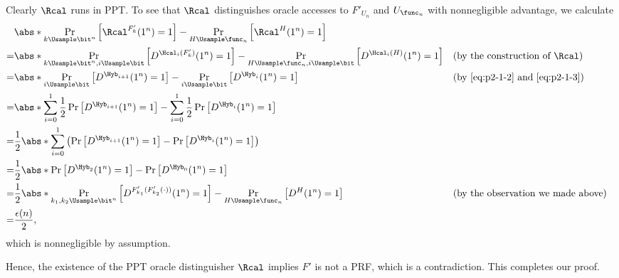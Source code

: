 \begin{answer}[a]
    Clearly $\Rcal$ runs in PPT. To see that $\Rcal$  distinguishes oracle accesses to $F'_{U_n}$ and $U_{\func_n}$ with nonnegligible advantage, we calculate
    \begin{align*}
        &\abs*{\Pr_{k\Usample\bit^n}\left[\Rcal^{F'_k}(1^n)=1\right] - \Pr_{H\Usample\func_n}\left[\Rcal^{H}(1^n)=1\right]}\\
        =&\abs*{\Pr_{k\Usample\bit^n,i\Usample\bit}\left[D^{\Hcal_i(F'_k)}(1^n)=1\right] - \Pr_{H\Usample\func_n,i\Usample\bit}\left[D^{\Hcal_i(H)}(1^n)=1\right]}
        &&\textrm{(by the construction of $\Rcal$)}\\
        =&\abs*{\Pr_{i\Usample\bit}\left[D^{\Hyb_{i+1}}(1^n)=1\right] - \Pr_{i\Usample\bit}\left[D^{\Hyb_i}(1^n)=1\right]}
        &&\textrm{(by \eqref{eq:p2-1-2} and \eqref{eq:p2-1-3})}\\
        =&\abs*{\sum_{i=0}^1 \frac{1}{2} \Pr\left[D^{\Hyb_{i+1}}(1^n)=1\right] - \sum_{i=0}^1 \frac{1}{2} \Pr\left[D^{\Hyb_i}(1^n)=1\right]}\\
        =&\frac{1}{2} \abs*{\sum_{i=0}^1 \left(  \Pr\left[D^{\Hyb_{i+1}}(1^n)=1\right] - \Pr\left[D^{\Hyb_i}(1^n)=1\right] \right) }\\
        =&\frac{1}{2} \abs*{  \Pr\left[D^{\Hyb_{2}}(1^n)=1\right] - \Pr\left[D^{\Hyb_0}(1^n)=1\right] }\\
        =&\frac{1}{2} \abs*{\Pr_{k_1,k_2\Usample\bit^n}\left[D^{F'_{k_1}(F'_{k_2}(\cdot))}(1^n)=1\right] - \Pr_{H\Usample\func_n}\left[D^{H}(1^n)=1\right]}
        && \textrm{(by the observation we made above)}\\
        =& \frac{\epsilon(n)}{2},
    \end{align*}
    which is nonnegligible by assumption.

    Hence, the existence of the PPT oracle distinguisher $\Rcal$ implies $F'$ is not a PRF, which is a contradiction. This completes our proof.
\end{answer}










